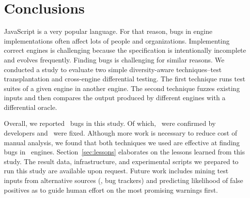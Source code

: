\documentclass[sigconf,review, anonymous]{acmart}
\begin{document}
\section{Conclusions}

JavaScript is a very popular language. For that reason, bugs in engine
implementations often affect lots of people and organizations.
Implementing correct engines is challenging because the specification
is intentionally incomplete and evolves frequently. Finding bugs is
challenging for similar reasons. We conducted a study to evaluate two
simple diversity-aware techniques--test transplantation and
cross-engine differential testing. The first technique runs test
suites of a given engine in another engine. The second technique
fuzzes existing inputs and then compares the output produced by
different engines with a differential oracle.

Overall, we reported \totalBugsReported\ bugs in this study. Of which,
\totalBugsConfirmed\ were confirmed by developers and
\totalBugsFixed\ were fixed. Although more work is necessary to
reduce cost of manual analysis, we found that both techniques we used
are effective at finding bugs in
\js\ engines. Section~\ref{sec:lessons} elaborates on the lessons
learned from this study. The result data, infrastructure, and
experimental scripts we prepared to run this study are available upon
request. Future work includes mining test inputs from alternative
sources (\eg{}, bug trackers) and predicting likelihood of false
positives as to guide human effort on the most promising warnings
first.

\balance


\end{document}
